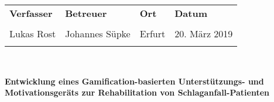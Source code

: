 \documentclass[a4paper, 12pt]{scrartcl}
\begin{document}

\begin{tabularx}{\textwidth}{Y|Y|Y|Y}
	\textbf{Verfasser} & \textbf{Betreuer} & \textbf{Ort} & \textbf{Datum}\\
	& & & \\
	Lukas Rost & Johannes Süpke & Erfurt & 20. März 2019 \\
	& & & \\
\end{tabularx} \\
\begin{center}
	\begin{LARGE}
		\textbf{Entwicklung eines Gamification-basierten Unterstützungs- und Motivationsgeräts zur Rehabilitation von Schlaganfall-Patienten \\}
	\end{LARGE}
\end{center}
\end{document}

